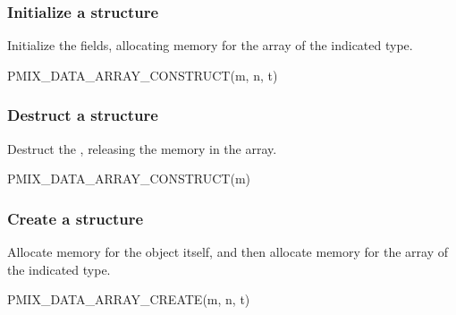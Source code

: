\subsubsection{Initialize a  structure}

Initialize the  fields, allocating memory for the array of the indicated type.

\cspecificstart
\begin{codepar}
PMIX_DATA_ARRAY_CONSTRUCT(m, n, t)
\end{codepar}
\cspecificend

\begin{arglist}
\end{arglist}


\subsubsection{Destruct a  structure}

Destruct the , releasing the memory in the array.

\cspecificstart
\begin{codepar}
PMIX_DATA_ARRAY_CONSTRUCT(m)
\end{codepar}
\cspecificend

\begin{arglist}
\end{arglist}


\subsubsection{Create a  structure}

Allocate memory for the  object itself, and then allocate memory for the array of the indicated type.

\cspecificstart
\begin{codepar}
PMIX_DATA_ARRAY_CREATE(m, n, t)
\end{codepar}
\cspecificend

